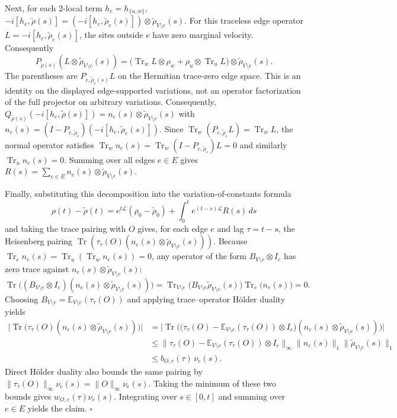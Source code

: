 \documentclass[
  11pt,
]{article}
\begin{document}
Next, for each 2-local term \(h_e = h_{\{u,w\}}\), \(-i[h_e, \widetilde{\rho}(s)] = (-i[h_e, \widetilde{\rho}_e(s)]) \otimes \widetilde{\rho}_{V\setminus e}(s)\).
For this traceless edge operator \(L=-i[h_e,\widetilde\rho_e(s)]\), the sites outside \(e\) have zero marginal velocity. Consequently
\[
P_{\widetilde\rho(s)}(L\otimes\widetilde\rho_{V\setminus e}(s))
=\bigl(\operatorname{Tr}_wL\otimes\rho_w+\rho_u\otimes\operatorname{Tr}_uL\bigr)\otimes\widetilde\rho_{V\setminus e}(s).
\]
The parentheses are \(P_{e,\widetilde\rho_e(s)}L\) on the Hermitian trace-zero edge space. This is an identity on the displayed edge-supported variations, not an operator factorization of the full projector on arbitrary variations.
Consequently, \(Q_{\widetilde{\rho}(s)}(-i[h_e, \widetilde{\rho}(s)]) = n_e(s) \otimes \widetilde{\rho}_{V\setminus e}(s)\) with \(n_e(s) = (I - P_{e, \widetilde{\rho}_e})(-i[h_e, \widetilde{\rho}_e(s)])\).
Since \(\operatorname{Tr}_w(P_{e, \widetilde{\rho}_e} L) = \operatorname{Tr}_w L\), the normal operator satisfies \(\operatorname{Tr}_w n_e(s) = \operatorname{Tr}_w(I - P_{e, \widetilde{\rho}_e})L = 0\) and similarly \(\operatorname{Tr}_u n_e(s) = 0\). Summing over all edges \(e\in E\) gives \(R(s) = \sum_{e\in E} n_e(s) \otimes \widetilde{\rho}_{V\setminus e}(s)\).

Finally, substituting this decomposition into the variation-of-constants formula
\[
\rho(t) - \widetilde{\rho}(t) = e^{t\mathcal{L}}(\rho_0 - \widetilde{\rho}_0) + \int_0^t e^{(t-s)\mathcal{L}} R(s)\,ds
\]
and taking the trace pairing with \(O\) gives, for each edge \(e\) and lag \(\tau = t-s\), the Heisenberg pairing \(\operatorname{Tr}(\tau_\tau(O)(n_e(s) \otimes \widetilde{\rho}_{V\setminus e}(s)))\). Because \(\operatorname{Tr}_e n_e(s) = \operatorname{Tr}_u(\operatorname{Tr}_w n_e(s)) = 0\), any operator of the form \(B_{V\setminus e}\otimes I_e\) has zero trace against \(n_e(s)\otimes\widetilde{\rho}_{V\setminus e}(s)\):
\[
\operatorname{Tr}\bigl((B_{V\setminus e}\otimes I_e)(n_e(s)\otimes\widetilde{\rho}_{V\setminus e}(s))\bigr) = \operatorname{Tr}_{V\setminus e}\bigl(B_{V\setminus e}\widetilde{\rho}_{V\setminus e}(s)\bigr)\operatorname{Tr}_e\bigl(n_e(s)\bigr) = 0.
\]
Choosing \(B_{V\setminus e} = \mathbb{E}_{V\setminus e}(\tau_\tau(O))\) and applying trace--operator Hölder duality yields
\[
\begin{aligned}
\bigl|\operatorname{Tr}\bigl(\tau_\tau(O)(n_e(s)\otimes\widetilde{\rho}_{V\setminus e}(s))\bigr)\bigr|
&= \bigl|\operatorname{Tr}\bigl(\bigl(\tau_\tau(O) - \mathbb{E}_{V\setminus e}(\tau_\tau(O))\otimes I_e\bigr)(n_e(s)\otimes\widetilde{\rho}_{V\setminus e}(s))\bigr)\bigr| \\
&\le \bigl\lVert \tau_\tau(O) - \mathbb{E}_{V\setminus e}(\tau_\tau(O))\otimes I_e\bigr\rVert_\infty \lVert n_e(s)\rVert_1 \lVert\widetilde{\rho}_{V\setminus e}(s)\rVert_1 \\
&\le b_{O,e}(\tau)\,\nu_e(s).
\end{aligned}
\]
Direct Hölder duality also bounds the same pairing by
\(\lVert\tau_\tau(O)\rVert_\infty\nu_e(s)=\lVert O\rVert_\infty\nu_e(s)\).
Taking the minimum of these two bounds gives \(w_{O,e}(\tau)\nu_e(s)\).
Integrating over \(s\in[0,t]\) and summing over \(e\in E\) yields the claim. \(\square\)
\end{document}
